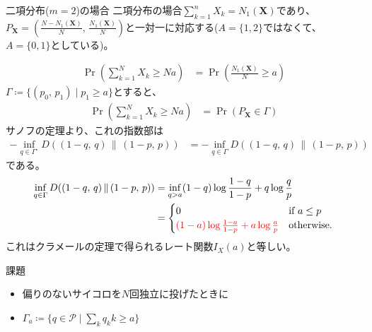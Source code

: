 \documentclass[lualatex,handout]{beamer}
\newcommand{\mycolor}[2]{%
  \begingroup
  \colorlet{currentcolor}{.}%
  \color{#1}#2%
  \color{currentcolor}%
  \endgroup
}
\newcommand{\emm}[1]{\mycolor{red}{#1}}
\newcommand\KL[2]{D(#1\,\|\,#2)}
\theoremstyle{definition}
\begin{document}
\begin{frame}{二項分布($m=2$)の場合}
\footnotesize
二項分布の場合$\sum_{k=1}^n X_k=N_1(\symbf{X})$であり、$P_{\symbf{X}}=\left(\frac{N-N_1(\symbf{X})}N,\,\frac{N_1(\symbf{X})}N\right)$と一対一に対応する($A=\{1,2\}$ではなくて、$A=\{0,1\}$としている)。

\begin{align*}
\Pr\left(\sum_{k=1}^N X_k \ge Na\right)
&=
\Pr\left(\frac{N_1(\symbf{X})}{N} \ge a\right)
\end{align*}
$\Gamma\coloneq \{(p_0,\,p_1)\mid p_1\ge a\}$とすると、
\begin{align*}
\Pr\left(\sum_{k=1}^N X_k \ge Na\right)
&=
\Pr\left(P_{\symbf{X}} \in\Gamma\right)
\end{align*}
サノフの定理より、これの指数部は
\begin{align*}
-\inf_{q\in\Gamma^\circ} \KL{(1-q,\,q)}{(1-p,\,p)}
&=-\inf_{q\in\Gamma} \KL{(1-q,\,q)}{(1-p,\,p)}
\end{align*}
である。
\begin{align*}
\inf_{q\in\Gamma} \KL{(1-q,\,q)}{(1-p,\,p)}&= \inf_{q> a} (1-q)\log\frac{1-q}{1-p} + q\log\frac{q}{p}\\
&= 
\begin{cases}
0&\text{if } a\le p\\
\emm{(1-a)\log\frac{1-a}{1-p} + a\log\frac{a}{p}}& \text{otherwise.}
\end{cases}
\end{align*}
これはクラメールの定理で得られるレート関数$I_X(a)$と等しい。
\end{frame}

\begin{frame}{課題}
\begin{itemize}
\item 偏りのないサイコロを$N$回独立に投げたときに
\item $\Gamma_a\coloneq\{q\in\mathcal{P}\mid \sum_k q_k k \ge a\}$
\end{itemize}
\end{frame}
\end{document}
